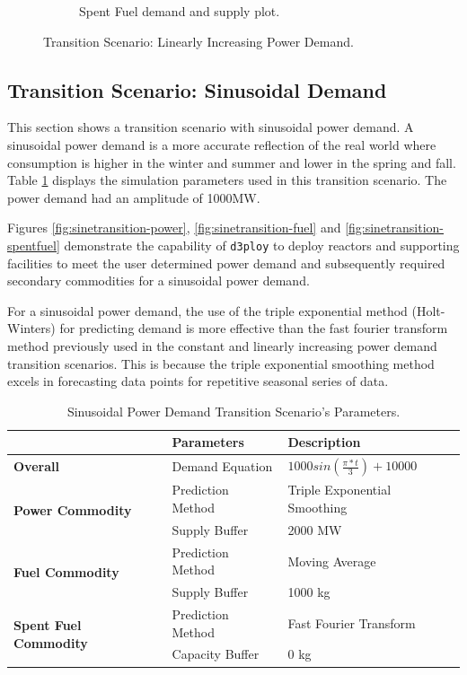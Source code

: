 \documentclass[11pt,letterpaper]{article}
\newcommand{\deploy}{\texttt{d3ploy}\xspace}%
\begin{document}
\begin{figure}[!htbp]
\begin{subfigure}[t]{0.45\textwidth}
        \caption{Spent Fuel demand and supply plot.}
        \label{fig:growingtransition-spentfuel}
    \end{subfigure}
    \caption{Transition Scenario: Linearly Increasing Power Demand.}
\end{figure}

\subsection{\textbf{Transition Scenario: Sinusoidal Demand}}
This section shows a transition scenario with sinusoidal
power demand. 
A sinusoidal power demand is a more accurate reflection of
the real world where consumption is higher in the winter and summer
and lower in the spring and fall. 
Table \ref{tab:transition-scenario-sine-power} displays the 
simulation parameters used in this transition scenario. The power demand
had an amplitude of 1000MW.

Figures \ref{fig:sinetransition-power}, \ref{fig:sinetransition-fuel}
and \ref{fig:sinetransition-spentfuel} demonstrate the capability 
of \deploy to deploy reactors and supporting facilities to meet the user 
determined power demand and subsequently required secondary commodities 
for a sinusoidal power demand. 

For a sinusoidal power demand, the use of the triple exponential method
(Holt-Winters)
for predicting demand is more effective than the 
fast fourier transform method previously used in the constant 
and linearly increasing power demand transition scenarios. 
This is because the triple exponential smoothing method excels in
forecasting data points for repetitive seasonal series of data.  

\begin{table}[!htbp]
	\centering
	\caption {Sinusoidal Power Demand Transition Scenario's Parameters.}
	\label{tab:transition-scenario-sine-power}
	\begin{tabular}{|l|l|p{4.5cm}|}
		\hline
		& \textbf{Parameters}    & \textbf{Description} \\ \hline
		\textbf{Overall}& Demand Equation & $1000sin(\frac{\pi*t}{3})+10000$ \\ \hline
		\multirow{2}{*}{\textbf{Power Commodity}} & Prediction Method      &  Triple Exponential Smoothing \\ \cline{2-3} 
		& Supply Buffer          &  2000 MW \\ \hline
		\multirow{2}{*}{\textbf{Fuel Commodity}}  & Prediction Method      &  Moving Average\\ \cline{2-3}
		& Supply Buffer & 1000 kg \\ \hline
		\multirow{2}{*}{\textbf{Spent Fuel Commodity}}  & Prediction Method      & Fast Fourier Transform\\ \cline{2-3}
		& Capacity Buffer & 0 kg \\ \hline
	\end{tabular}
\end{table}
\end{document}

